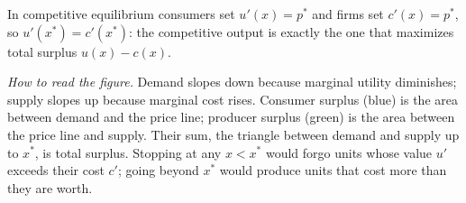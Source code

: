 \begin{keybox}[title=First welfare result (partial equilibrium)]
In competitive equilibrium consumers set $u'(x)=p^*$ and firms set $c'(x)=p^*$, so $u'(x^*)=c'(x^*)$: the competitive output is exactly the one that maximizes total surplus $u(x)-c(x)$.
\end{keybox}

\begin{center}
\end{center}
\textit{How to read the figure.} Demand slopes down because marginal utility diminishes; supply slopes up because marginal cost rises. Consumer surplus (blue) is the area between demand and the price line; producer surplus (green) is the area between the price line and supply. Their sum, the triangle between demand and supply up to $x^*$, is total surplus. Stopping at any $x<x^*$ would forgo units whose value $u'$ exceeds their cost $c'$; going beyond $x^*$ would produce units that cost more than they are worth.

